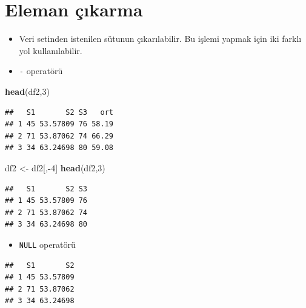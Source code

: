 \documentclass[
  oneside]{book}
\newenvironment{Shaded}{\begin{snugshade}}{\end{snugshade}}
\newcommand{\ConstantTok}[1]{\textcolor[rgb]{0.56,0.35,0.01}{#1}}
\newcommand{\DecValTok}[1]{\textcolor[rgb]{0.00,0.00,0.81}{#1}}
\newcommand{\FunctionTok}[1]{\textcolor[rgb]{0.13,0.29,0.53}{\textbf{#1}}}
\newcommand{\NormalTok}[1]{#1}
\newcommand{\OtherTok}[1]{\textcolor[rgb]{0.56,0.35,0.01}{#1}}
\newcommand{\SpecialCharTok}[1]{\textcolor[rgb]{0.81,0.36,0.00}{\textbf{#1}}}
\providecommand{\tightlist}{%
  \setlength{\itemsep}{0pt}\setlength{\parskip}{0pt}}
\begin{document}
\hypertarget{eleman-uxe7ux131karma}{%
\section{Eleman çıkarma}\label{eleman-uxe7ux131karma}}

\begin{itemize}
\item
  Veri setinden istenilen sütunun çıkarılabilir. Bu işlemi yapmak için iki farklı yol kullanılabilir.
\item
  \texttt{-} operatörü
\end{itemize}

\begin{Shaded}
\begin{Highlighting}[]
\FunctionTok{head}\NormalTok{(df2,}\DecValTok{3}\NormalTok{)}
\end{Highlighting}
\end{Shaded}

\begin{verbatim}
##   S1       S2 S3   ort
## 1 45 53.57809 76 58.19
## 2 71 53.87062 74 66.29
## 3 34 63.24698 80 59.08
\end{verbatim}

\begin{Shaded}
\begin{Highlighting}[]
\NormalTok{df2 }\OtherTok{\textless{}{-}}\NormalTok{ df2[,}\SpecialCharTok{{-}}\DecValTok{4}\NormalTok{] }
\FunctionTok{head}\NormalTok{(df2,}\DecValTok{3}\NormalTok{)}
\end{Highlighting}
\end{Shaded}

\begin{verbatim}
##   S1       S2 S3
## 1 45 53.57809 76
## 2 71 53.87062 74
## 3 34 63.24698 80
\end{verbatim}

\begin{itemize}
\tightlist
\item
  \texttt{NULL} operatörü
\end{itemize}

\begin{Shaded}
\end{Shaded}

\begin{verbatim}
##   S1       S2
## 1 45 53.57809
## 2 71 53.87062
## 3 34 63.24698
\end{verbatim}
\end{document}
